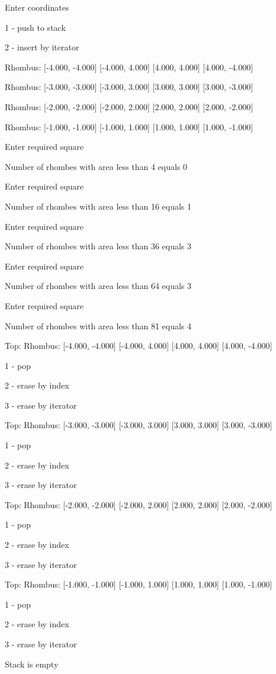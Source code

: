 \documentclass[a4paper, 12pt]{article}
\begin{document}
Enter coordinates

1 - push to stack

2 - insert by iterator

Rhombus: [-4.000, -4.000] [-4.000, 4.000] [4.000, 4.000] [4.000, -4.000] 

Rhombus: [-3.000, -3.000] [-3.000, 3.000] [3.000, 3.000] [3.000, -3.000] 

Rhombus: [-2.000, -2.000] [-2.000, 2.000] [2.000, 2.000] [2.000, -2.000] 

Rhombus: [-1.000, -1.000] [-1.000, 1.000] [1.000, 1.000] [1.000, -1.000] 

Enter required square

Number of rhombes with area less than 4 equals 0

Enter required square

Number of rhombes with area less than 16 equals 1

Enter required square

Number of rhombes with area less than 36 equals 3

Enter required square

Number of rhombes with area less than 64 equals 3

Enter required square

Number of rhombes with area less than 81 equals 4

Top: Rhombus: [-4.000, -4.000] [-4.000, 4.000] [4.000, 4.000] [4.000, -4.000] 

1 - pop

2 - erase by index

3 - erase by iterator

Top: Rhombus: [-3.000, -3.000] [-3.000, 3.000] [3.000, 3.000] [3.000, -3.000] 

1 - pop

2 - erase by index

3 - erase by iterator

Top: Rhombus: [-2.000, -2.000] [-2.000, 2.000] [2.000, 2.000] [2.000, -2.000] 

1 - pop

2 - erase by index

3 - erase by iterator

Top: Rhombus: [-1.000, -1.000] [-1.000, 1.000] [1.000, 1.000] [1.000, -1.000] 

1 - pop

2 - erase by index

3 - erase by iterator

Stack is empty
\end{document}
